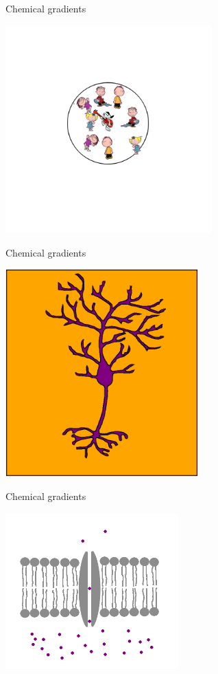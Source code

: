 \documentclass{beamer}
\begin{document}
\begin{frame}{Chemical gradients}
\begin{center}
    \includegraphics[height=8cm]{children4.png}
\end{center}
\end{frame}

\begin{frame}{Chemical gradients}
  \begin{center}
    \includegraphics[height=8cm]{neuron_ions.png}
  \end{center}
\end{frame}


\begin{frame}{Chemical gradients}
  \begin{center}
    \includegraphics[height=6cm]{passive_channel.png}
  \end{center}
\end{frame}
\end{document}
